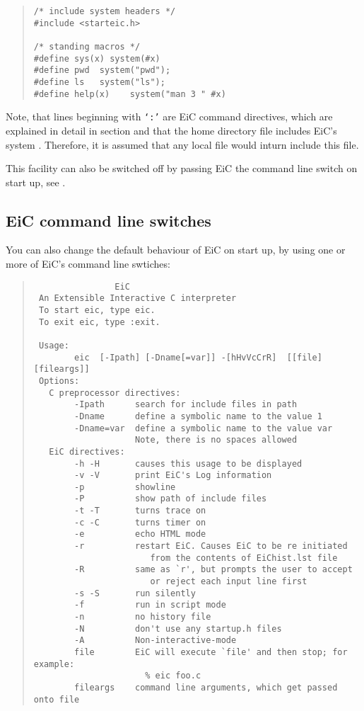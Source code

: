 \begin{quote}
\begin{verbatim}
/* include system headers */
#include <starteic.h>

/* standing macros */
#define sys(x) system(#x)
#define pwd  system("pwd");
#define ls   system("ls");
#define help(x)    system("man 3 " #x)
\end{verbatim}
\end{quote}

Note, that lines beginning with {\tt `:'} are EiC command directives,
which are explained in detail in section  and
that the home directory  file includes
EiC's system . Therefore, it is assumed
that any local  file would inturn include this
file. 

This facility can also be switched off by passing EiC the
 command line switch on start up,
see .


\subsection{EiC command line switches}
\label{sec:EiCCommandLineOptions}

You can also change the default behaviour of EiC on start up, by using
one or more of EiC's command line swtiches:

\begin{quote}
\begin{verbatim}
                EiC
 An Extensible Interactive C interpreter
 To start eic, type eic.
 To exit eic, type :exit.

 Usage:
        eic  [-Ipath] [-Dname[=var]] -[hHvVcCrR]  [[file] [fileargs]]
 Options:
   C preprocessor directives:
        -Ipath      search for include files in path
        -Dname      define a symbolic name to the value 1
        -Dname=var  define a symbolic name to the value var
                    Note, there is no spaces allowed
   EiC directives:
        -h -H       causes this usage to be displayed
        -v -V       print EiC's Log information
        -p          showline
        -P          show path of include files
        -t -T       turns trace on
        -c -C       turns timer on
        -e          echo HTML mode
        -r          restart EiC. Causes EiC to be re initiated
                       from the contents of EiChist.lst file
        -R          same as `r', but prompts the user to accept
                       or reject each input line first
        -s -S       run silently
        -f          run in script mode
        -n          no history file
        -N          don't use any startup.h files
        -A          Non-interactive-mode
        file        EiC will execute `file' and then stop; for example:
                      % eic foo.c 
        fileargs    command line arguments, which get passed onto file
\end{verbatim}
\end{quote}

